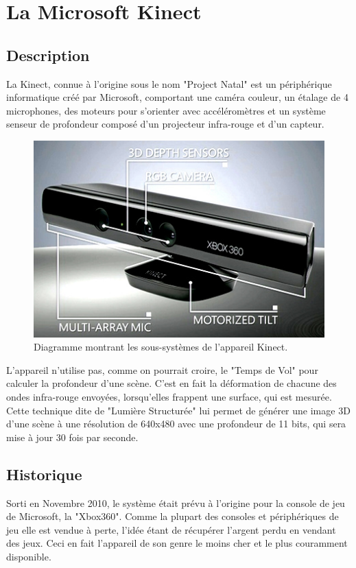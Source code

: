 \section{La Microsoft Kinect}

\subsection{Description}
La Kinect, connue à l'origine sous le nom "Project Natal" est un
périphérique informatique créé par Microsoft, comportant une caméra
couleur, un étalage de 4 microphones, des moteurs pour s'orienter avec 
accéléromètres 
et un système senseur de profondeur composé d'un 
projecteur infra-rouge et d'un capteur. 
  \begin{figure}[h!]
  \centering
  \includegraphics[width=0.8\linewidth]{../images/kinect_diagram}
  \caption{Diagramme montrant les sous-systèmes de l'appareil Kinect.}
  \end{figure}
L'appareil n'utilise pas, comme on pourrait croire, le "Temps de Vol" pour
calculer la profondeur d'une scène. C'est en fait la déformation de chacune des 
ondes infra-rouge envoyées, lorsqu'elles frappent une surface, qui est mesurée. Cette technique dite de 
"Lumière Structurée"
lui permet de générer une image 3D d'une scène à une résolution de 640x480 avec 
une profondeur de 11 bits, qui sera mise à jour 30 fois par seconde.

\subsection{Historique}
Sorti en Novembre 2010, le système était prévu à l'origine pour la console
de jeu de Microsoft, la "Xbox360". Comme la plupart des consoles et
périphériques de jeu elle
est vendue à perte, l'idée étant de récupérer l'argent perdu en vendant
des jeux. Ceci en fait l'appareil de son genre le moins cher et le plus couramment
disponible.

